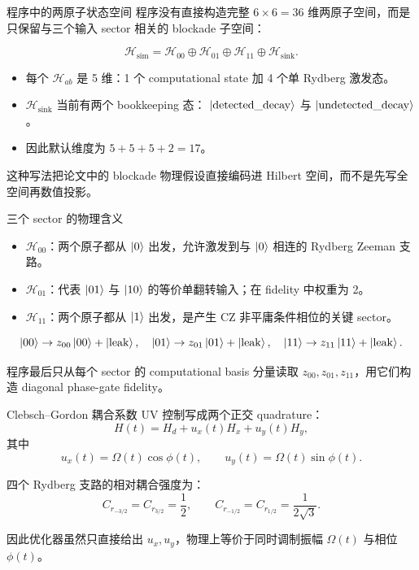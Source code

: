 \documentclass[aspectratio=169,11pt]{ctexbeamer}
\begin{document}
\begin{frame}{程序中的两原子状态空间}
  程序没有直接构造完整 \(6\times 6=36\) 维两原子空间，而是只保留与三个输入 sector 相关的 blockade 子空间：

  \[
    \mathcal{H}_{\mathrm{sim}}
    =
    \mathcal{H}_{00}
    \oplus
    \mathcal{H}_{01}
    \oplus
    \mathcal{H}_{11}
    \oplus
    \mathcal{H}_{\mathrm{sink}}.
  \]

  \begin{itemize}
    \item 每个 \(\mathcal{H}_{ab}\) 是 5 维：1 个 computational state 加 4 个单 Rydberg 激发态。
    \item \(\mathcal{H}_{\mathrm{sink}}\) 当前有两个 bookkeeping 态：
      \(\ket{\mathrm{detected\_decay}}\) 与 \(\ket{\mathrm{undetected\_decay}}\)。
    \item 因此默认维度为 \(5+5+5+2=17\)。
  \end{itemize}

  这种写法把论文中的 blockade 物理假设直接编码进 Hilbert 空间，而不是先写全空间再数值投影。
\end{frame}

\begin{frame}{三个 sector 的物理含义}
  \begin{itemize}
    \item \(\mathcal{H}_{00}\)：两个原子都从 \(\ket{0}\) 出发，允许激发到与 \(\ket{0}\) 相连的 Rydberg Zeeman 支路。
    \item \(\mathcal{H}_{01}\)：代表 \(\ket{01}\) 与 \(\ket{10}\) 的等价单翻转输入；在 fidelity 中权重为 2。
    \item \(\mathcal{H}_{11}\)：两个原子都从 \(\ket{1}\) 出发，是产生 CZ 非平庸条件相位的关键 sector。
  \end{itemize}

  \[
    \ket{00}\rightarrow z_{00}\ket{00}+\ket{\mathrm{leak}},
    \quad
    \ket{01}\rightarrow z_{01}\ket{01}+\ket{\mathrm{leak}},
    \quad
    \ket{11}\rightarrow z_{11}\ket{11}+\ket{\mathrm{leak}}.
  \]

  程序最后只从每个 sector 的 computational basis 分量读取 \(z_{00},z_{01},z_{11}\)，用它们构造 diagonal phase-gate fidelity。
\end{frame}

\begin{frame}{Clebsch--Gordon 耦合系数}
  UV 控制写成两个正交 quadrature：
  \[
    H(t)=H_d+u_x(t)H_x+u_y(t)H_y,
  \]
  其中
  \[
    u_x(t)=\Omega(t)\cos\phi(t),\qquad
    u_y(t)=\Omega(t)\sin\phi(t).
  \]

  四个 Rydberg 支路的相对耦合强度为：
  \[
    C_{r_{-3/2}}=C_{r_{3/2}}=\frac{1}{2},\qquad
    C_{r_{-1/2}}=C_{r_{1/2}}=\frac{1}{2\sqrt{3}}.
  \]

  因此优化器虽然只直接给出 \(u_x,u_y\)，物理上等价于同时调制振幅 \(\Omega(t)\) 与相位 \(\phi(t)\)。
\end{frame}
\end{document}
